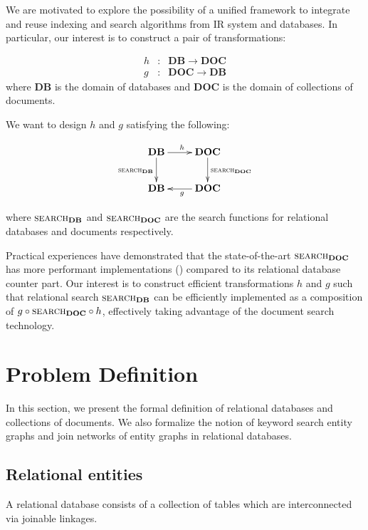 \documentclass[conference]{IEEEtran}
\newcommand{\op}[1]{{\textsc{#1}}}
\newcommand{\DB}{\mathbf{DB}}
\newcommand{\DOC}{\mathbf{DOC}}
\begin{document}
We are motivated to explore the possibility of a unified framework to integrate and reuse indexing and search algorithms from IR system and databases.  In particular, our interest is to construct a pair of transformations:

\begin{eqnarray*}
h &:& \mathbf{DB} \to \mathbf{DOC} \\
g &:& \mathbf{DOC} \to \mathbf{DB}
\end{eqnarray*}
where $\mathbf{DB}$ is the domain of databases and $\mathbf{DOC}$ is the domain of collections of documents.

We want to design $h$ and $g$ satisfying the following:

\begin{displaymath}
\xymatrix {
    \mathbf{DB} \ar[r]^h\ar[d]_{\op{search}_\mathbf{DB}} 
        & \mathbf{DOC}\ar[d]^{\op{search}_\mathbf{DOC}} \\
    \mathbf{DB} & \mathbf{DOC}\ar[l]^g
}
\end{displaymath}

where $\op{search}_\DB$ and $\op{search}_\DOC$ are the search functions for relational databases and documents respectively.

Practical experiences have demonstrated that the state-of-the-art $\op{search}_\DOC$ has more performant implementations (\cite{xapian,lucene}) compared to its relational database counter part.  Our interest is to construct efficient transformations $h$ and $g$ such that relational search $\op{search}_\DB$ can be efficiently implemented as a composition of $g\circ \op{search}_\DOC\circ h$, effectively taking advantage of the document search technology.

\section{Problem Definition}

In this section, we present the formal definition of relational databases and collections of documents.  We also formalize the notion of keyword search entity graphs and join networks of entity graphs in relational databases.

\subsection{Relational entities}

A relational database consists of a collection of tables which are interconnected via joinable linkages.
\end{document}
